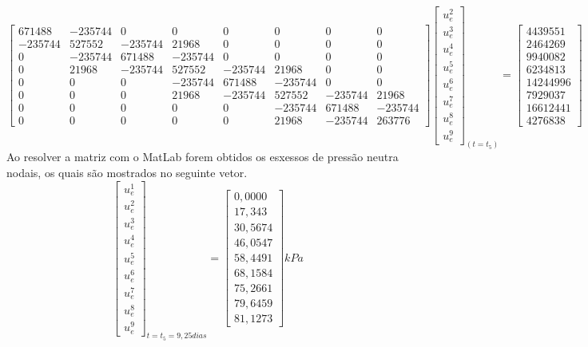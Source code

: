 \documentclass{article} %
\begin{document}
\begin{equation*}
\begin{bmatrix}
671488& -235744& 0& 0& 0& 0& 0& 0\\
-235744&527552&-235744&21968& 0& 0& 0& 0\\
0&-235744&671488&-235744& 0& 0& 0& 0\\
0&21968&-235744&527552&-235744&21968& 0& 0\\
0&0&0& -235744&671488&-235744& 0& 0\\
0&0&0&21968&-235744&527552&-235744&21968\\
0&0&0&0&0&-235744&671488&-235744\\
0&0&0&0&0&21968&-235744&263776
\end{bmatrix}\begin{bmatrix}
u_e^2\\
u_e^3\\
u_e^4\\
u_e^5\\
u_e^6\\
u_e^7\\
u_e^8\\
u_e^9
\end{bmatrix}_{(t=t_5)}
=\begin{bmatrix}
4439551\\
2464269\\
9940082\\
6234813\\
14244996\\
7929037\\
16612441\\
4276838
\end{bmatrix}
\end{equation*}
\indent Ao resolver a matriz com o MatLab forem obtidos os esxessos de pressão neutra nodais, os quais são mostrados no seguinte vetor.
\begin{equation}\label{t5}
\begin{bmatrix}
u_e^1\\
u_e^2\\
u_e^3\\
u_e^4\\
u_e^5\\
u_e^6\\
u_e^7\\
u_e^8\\
u_e^9
\end{bmatrix}_{t=t_5=9,25dias}=\begin{bmatrix}
0,0000\\
17,343\\
30,5674\\
46,0547\\
58,4491\\
68,1584\\
75,2661\\
79,6459\\
81,1273
\end{bmatrix}kPa
\end{equation}
\end{document}
